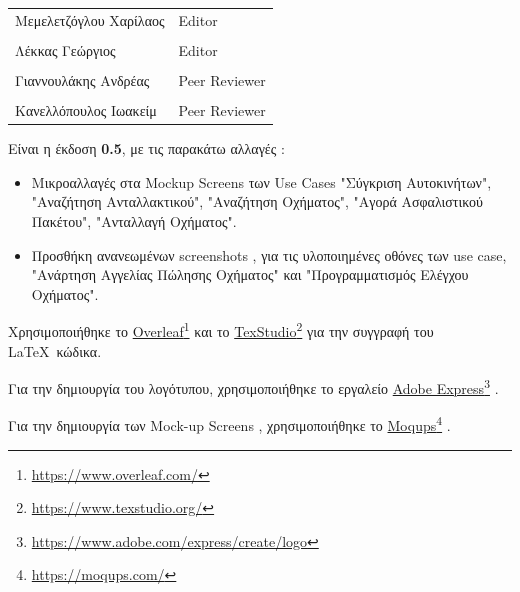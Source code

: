\documentclass{../ol-softwaremanual}
\newcommand{\doclink}[2]{\href{#1}{#2}\footnote{\url{#1}}}
\begin{document}
	
	\vspace{20pt}
	
	\begin{table}[htbp!]
		\begin{tabular}{ll}
			Μεμελετζόγλου Χαρίλαος & \en Editor \\
			\\ Λέκκας Γεώργιος      &   \en  Editor \\
			\\ Γιαννουλάκης Ανδρέας & \en Peer Reviewer \\
			\\ Κανελλόπουλος Ιωακείμ & \en Peer Reviewer
		\end{tabular}
	\end{table}
	
	\vspace{10pt}
	\flushleft
	
	Είναι η έκδοση \textbf{0.5}, με τις παρακάτω αλλαγές :
	
	\begin{itemize}
		\item Μικροαλλαγές στα \en Mockup Screens \gr των \en Use Cases \en"\gr Σύγκριση Αυτοκινήτων\en"\gr , \en"\gr Αναζήτηση Ανταλλακτικού\en"\gr , \en"\gr Αναζήτηση Οχήματος\en"\gr , \en"\gr Αγορά Ασφαλιστικού Πακέτου\en"\gr , \en"\gr Ανταλλαγή Οχήματος\en"\gr . \break
		
		\item Προσθήκη ανανεωμένων \en screenshots \gr, για τις υλοποιημένες οθόνες των \en use case, "\gr Ανάρτηση Αγγελίας Πώλησης Οχήματος\en" \gr και \en"\gr Προγραμματισμός Ελέγχου Οχήματος\en"\gr .	
	\end{itemize}

	\newpage
	
	
	\vspace{20pt}
	\flushleft
	
	Χρησιμοποιήθηκε το \en \doclink{https://www.overleaf.com/}{Overleaf} \gr και το \en \doclink{https://www.texstudio.org/}{TexStudio} \gr για την συγγραφή του \LaTeX\ κώδικα. \break
	
	Για την δημιουργία του λογότυπου, χρησιμοποιήθηκε το εργαλείο \en \doclink{https://www.adobe.com/express/create/logo}{Adobe Express} . \gr \break
	
	Για την δημιουργία των \en Mock-up Screens \gr, χρησιμοποιήθηκε το \en \doclink{https://moqups.com/}{Moqups} \gr . \break
	
\end{document}
